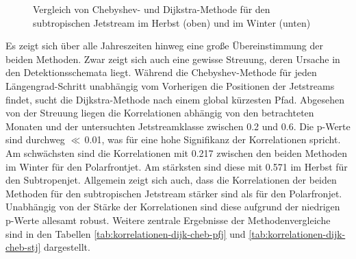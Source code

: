 \begin{figure}[hbt] 
  \centering
  \begin{minipage}{\textwidth}
  \centering
  \end{minipage}
  \begin{minipage}{\textwidth}
  \centering
  \end{minipage}
  \caption[Vergleich des Subtropenjets nach beiden Methoden für Herbst und Winter]{Vergleich von Chebyshev- und Dijkstra-Methode für den subtropischen Jetstream im Herbst (oben) und im Winter (unten)} \label{fig:comp-stj-cold}
\end{figure}


Es zeigt sich über alle Jahreszeiten hinweg eine große Übereinstimmung der beiden Methoden. Zwar zeigt sich auch eine gewisse Streuung, deren Ursache in den Detektionsschemata liegt. Während die Chebyshev-Methode für jeden Längengrad-Schritt unabhängig vom Vorherigen die Positionen der Jetstreams findet, sucht die Dijkstra-Methode nach einem global kürzesten Pfad. Abgesehen von der Streuung liegen die Korrelationen abhängig von den betrachteten Monaten und der untersuchten Jetstreamklasse zwischen \num{0.2} und \num{0.6}. Die p-Werte sind durchweg $\ll$\,\num{0.01}, was für eine hohe Signifikanz der Korrelationen spricht. Am schwächsten sind die Korrelationen mit \num{0.217} zwischen den beiden Methoden im Winter für den Polarfrontjet. Am stärksten sind diese mit \num{0.571} im Herbst für den Subtropenjet. Allgemein zeigt sich auch, dass die Korrelationen der beiden Methoden für den subtropischen Jetstream stärker sind als für den Polarfronjet. Unabhängig von der Stärke der Korrelationen sind diese aufgrund der niedrigen p-Werte allesamt robust. Weitere zentrale Ergebnisse der Methodenvergleiche sind in den Tabellen \ref{tab:korrelationen-dijk-cheb-pfj} und \ref{tab:korrelationen-dijk-cheb-stj} dargestellt.

